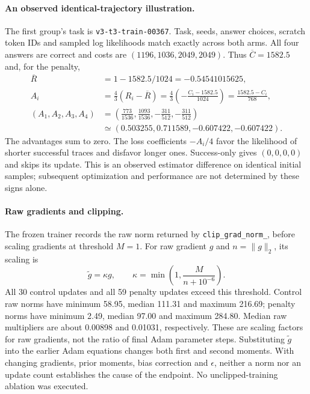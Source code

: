\documentclass[11pt]{article}
\begin{document}
\paragraph{An observed identical-trajectory illustration.}
The first group's task is \texttt{v3-t3-train-00367}. Task, seeds, answer choices, scratch token IDs and sampled log likelihoods match exactly across both arms. All four answers are correct and costs are $(1196,1036,2049,2049)$. Thus $\overline C=1582.5$ and, for the penalty,
\begin{align}
\overline R&=1-1582.5/1024=-0.54541015625,\\
A_i&=\frac43(R_i-\overline R)
=\frac43\left(-\frac{C_i-1582.5}{1024}\right)
=\frac{1582.5-C_i}{768},\\
(A_1,A_2,A_3,A_4)&=\left(\frac{773}{1536},\frac{1093}{1536},-\frac{311}{512},-\frac{311}{512}\right)\\
&\simeq(0.503255,0.711589,-0.607422,-0.607422).
\end{align}
The advantages sum to zero. The loss coefficients $-A_i/4$ favor the likelihood of shorter successful traces and disfavor longer ones. Success-only gives $(0,0,0,0)$ and skips its update. This is an observed estimator difference on identical initial samples; subsequent optimization and performance are not determined by these signs alone.

\paragraph{Raw gradients and clipping.}
The frozen trainer records the raw norm returned by \texttt{clip\_grad\_norm\_}, before scaling gradients at threshold $M=1$. For raw gradient $g$ and $n=\|g\|_2$, its scaling is
\begin{equation}
\widetilde g=\kappa g,\qquad \kappa=\min\left(1,\frac{M}{n+10^{-6}}\right).
\end{equation}
All 30 control updates and all 59 penalty updates exceed this threshold. Control raw norms have minimum 58.95, median 111.31 and maximum 216.69; penalty norms have minimum 2.49, median 97.00 and maximum 284.80. Median raw multipliers are about 0.00898 and 0.01031, respectively. These are scaling factors for raw gradients, not the ratio of final Adam parameter steps. Substituting $\widetilde g$ into the earlier Adam equations changes both first and second moments. With changing gradients, prior moments, bias correction and $\epsilon$, neither a norm nor an update count establishes the cause of the endpoint. No unclipped-training ablation was executed.
\end{document}
